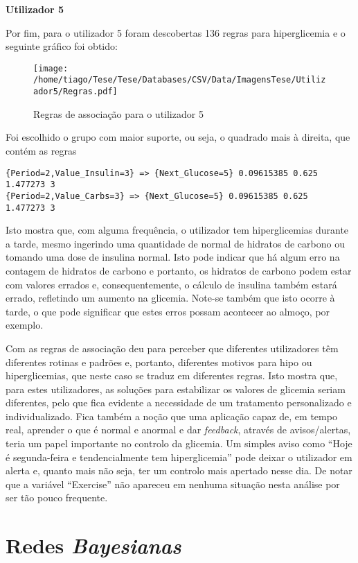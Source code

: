 \textbf{Utilizador 5}

Por fim, para o utilizador 5 foram descobertas 136 regras para hiperglicemia e o seguinte gráfico foi obtido:

\begin{figure}[H]
\centering
\texttt{[image: /home/tiago/Tese/Tese/Databases/CSV/Data/ImagensTese/Utilizador5/Regras.pdf]}
\caption{Regras de associação para o utilizador 5}
\end{figure}
Foi escolhido o grupo com maior suporte, ou seja, o quadrado mais à direita, que contém as regras

\begin{lstlisting}
{Period=2,Value_Insulin=3} => {Next_Glucose=5} 0.09615385 0.625      1.477273 3    
{Period=2,Value_Carbs=3} => {Next_Glucose=5} 0.09615385 0.625      1.477273 3    
\end{lstlisting}
Isto mostra que, com alguma frequência, o utilizador tem hiperglicemias durante a tarde, mesmo ingerindo uma quantidade de normal de hidratos de carbono ou tomando uma dose de insulina normal. Isto pode indicar que há algum erro na contagem de hidratos de carbono e portanto, os hidratos de carbono podem estar com valores errados e, consequentemente, o cálculo de insulina também estará errado, refletindo um aumento na glicemia. Note-se também que isto ocorre à tarde, o que pode significar que estes erros possam acontecer ao almoço, por exemplo.\newline

Com as regras de associação deu para perceber que diferentes utilizadores têm diferentes rotinas e padrões e, portanto, diferentes motivos para hipo ou hiperglicemias, que neste caso se traduz em diferentes regras. Isto mostra que, para estes utilizadores, as soluções para estabilizar os valores de glicemia seriam diferentes, pelo que fica evidente a necessidade de um tratamento personalizado e individualizado. Fica também a noção que uma aplicação capaz de, em tempo real, aprender o que é normal e anormal e dar \textit{feedback}, através de avisos/alertas, teria um papel importante no controlo da glicemia. Um simples aviso como ``Hoje é segunda-feira e tendencialmente tem hiperglicemia'' pode deixar o utilizador em alerta e, quanto mais não seja, ter um controlo mais apertado nesse dia.
De notar que a variável ``Exercise'' não apareceu em nenhuma situação nesta análise por ser tão pouco frequente.

\section{Redes \textit{Bayesianas}}

